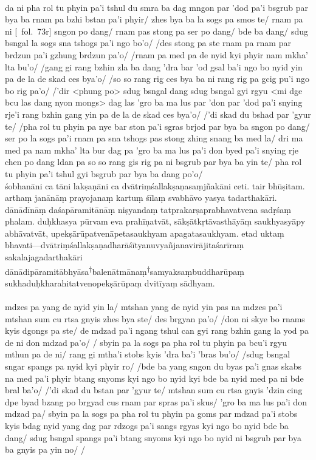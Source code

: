 \documentclass[12pt]{article}
\newcommand{\crux} {\hspace{0em}\textsuperscript{†}\hspace{0em}}
\newcommand{\emdash} {\hspace{0em}—\hspace{0em}}
\begin{document}
\textbf{\TVB}\\
da ni pha rol tu phyin pa'i tshul du smra ba dag mngon par 'dod pa'i bsgrub par bya ba rnam pa bzhi bstan pa'i phyir/ zhes bya ba la sogs pa smos te/ rnam pa ni [\TVB\ fol.\ 73r] sngon po dang/ rnam pas stong pa ser po dang/ bde ba dang/ sdug bsngal la sogs sna tshogs pa'i ngo bo'o/ /des stong pa ste rnam pa rnam par brdzun pa'i gzhung brdzun pa'o/ /rnam pa med pa de nyid kyi phyir nam mkha' lta bu'o/ /gang gi rang bzhin zla ba dang 'dra bar 'od gsal ba'i ngo bo nyid yin pa de la de skad ces bya'o/ /so so rang rig ces bya ba ni rang rig pa gcig pu'i ngo bo rig pa'o/ /'dir <phung po> sdug bsngal dang sdug bsngal gyi rgyu <mi dge bcu las dang nyon mongs> dag las 'gro ba ma lus par 'don par 'dod pa'i snying rje'i rang bzhin gang yin pa de la de skad ces bya'o/ /'di skad du bshad par 'gyur te/ /pha rol tu phyin pa nye bar ston pa'i sgras brjod par bya ba sngon po dang/ ser po la sogs pa'i rnam pa sna tshogs pas stong zhing snang ba med la/ dri ma med pa nam mkha' lta bur dag pa 'gro ba ma lus pa'i don byed pa'i snying rje chen po dang ldan pa so so rang gis rig pa ni bsgrub par bya ba yin te/ pha rol tu phyin pa'i tshul gyi bsgrub par bya ba dang po'o/\\

śobhanāni ca tāni lakṣaṇāni ca dvātriṃśallakṣaṇasaṃjñakāni ceti.
tair bhūṣitam.
arthaṃ janānāṃ prayojanaṃ kartuṃ śīlaṃ svabhāvo yasya tadarthakāri.
dānādīnāṃ daśapāramitānāṃ niṣyandaṃ tatprakarṣaprabhavatvena sadṛśaṃ phalam.
duḥkhasya pūrvam eva prahīṇatvāt, sākṣātkṛtāvasthāyāṃ\footnoteB{
	sākṣātkṛtāvasthāyāṃ] \EDD; sākṣātkṛtāvatāsthāyāṃ \MS
} saukhyasyāpy abhāvatvāt, upekṣārūpatvenāpetasaukhyam apagatasaukhyam.
etad uktaṃ bhavati\emdash dvātriṃśallakṣaṇadharāśītyanuvyañjanavirājitaśarīraṃ sakalajagadarthakāri dānādipāramitābhyāsa\crux balenātmānaṃ\footnoteB{
	°balenātmānaṃ] \MS\ \EDD; stobs kyis bdag nyid yang dag par rdzogs pa'i \TVA; stobs kyis byung ba yang dag par \TVB
}\crux samyaksaṃbuddharūpaṃ sukhaduḥkharahitatvenopekṣārūpaṃ dvitīyaṃ sādhyam.\\

\textbf{\TVA}\\
mdzes pa yang de nyid yin la/ mtshan yang de nyid yin pas na mdzes pa'i mtshan sum cu rtsa gnyis zhes bya ste/ des brgyan pa'o/ /don ni skye bo rnams kyis dgongs pa ste/ de mdzad pa'i ngang tshul can gyi rang bzhin gang la yod pa de ni don mdzad pa'o/ / sbyin pa la sogs pa pha rol tu phyin pa bcu'i rgyu mthun pa de ni/ rang gi mtha'i stobs kyis 'dra ba'i 'bras bu'o/ /sdug bsngal sngar spangs pa nyid kyi phyir ro/ /bde ba yang sngon du byas pa'i gnas skabs na med pa'i phyir btang snyoms kyi ngo bo nyid kyi bde ba nyid med pa ni bde bral ba'o/ /'di skad du bstan par 'gyur te/ mtshan sum cu rtsa gnyis 'dzin cing dpe byad bzang po brgyad cus rnam par spras pa'i skus/ 'gro ba ma lus pa'i don mdzad pa/ sbyin pa la sogs pa pha rol tu phyin pa goms par mdzad pa'i stobs kyis bdag nyid yang dag par rdzogs pa'i sangs rgyas kyi ngo bo nyid bde ba dang/ sdug bsngal spangs pa'i btang snyoms kyi ngo bo nyid ni bsgrub par bya ba gnyis pa yin no/ /\\
\end{document}
